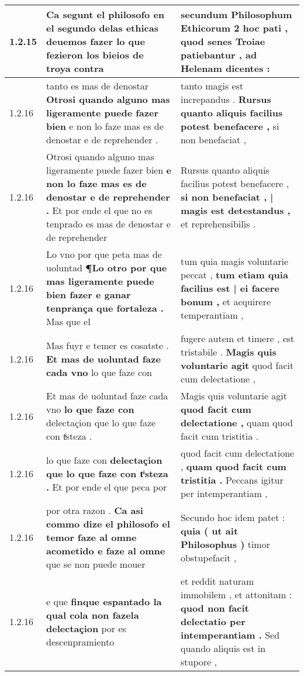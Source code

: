 \begin{tabular}{|p{1cm}|p{6.5cm}|p{6.5cm}|}
1.2.15 & Ca segunt el philosofo \textbf{ en el segundo delas ethicas deuemos fazer lo que fezieron los bieios de troya } contra & secundum Philosophum Ethicorum 2 hoc pati , \textbf{ quod senes Troiae patiebantur , } ad Helenam dicentes : \\\hline
1.2.16 & tanto es mas de denostar \textbf{ Otrosi quando alguno mas ligeramente puede fazer bien } e non lo faze mas es de denostar e de reprehender . & tanto magis est increpandus . \textbf{ Rursus quanto aliquis facilius potest benefacere , } si non benefaciat , \\\hline
1.2.16 & Otrosi quando alguno mas ligeramente puede fazer bien \textbf{ e non lo faze mas es de denostar e de reprehender . } Et por ende el que no es tenprado es mas de denostar e de reprehender & Rursus quanto aliquis facilius potest benefacere , \textbf{ si non benefaciat , | magis est detestandus , } et reprehensibilis . \\\hline
1.2.16 & Lo vno por que peta mas de uoluntad \textbf{ ¶Lo otro por que mas ligeramente puede bien fazer e ganar tenprança que fortaleza . } Mas que el & tum quia magis voluntarie peccat , \textbf{ tum etiam quia facilius est | ei facere bonum , } et acquirere temperantiam , \\\hline
1.2.16 & Mas fuyr e temer es cosatste . \textbf{ Et mas de uoluntad faze cada vno } lo que faze con & fugere autem et timere , est tristabile . \textbf{ Magis quis voluntarie agit } quod facit cum delectatione , \\\hline
1.2.16 & Et mas de uoluntad faze cada vno \textbf{ lo que faze con } delectaçion que lo que faze con tͥsteza . & Magis quis voluntarie agit \textbf{ quod facit cum delectatione , } quam quod facit cum tristitia . \\\hline
1.2.16 & lo que faze con \textbf{ delectaçion que lo que faze con tͥsteza . } Et por ende el que peca por & quod facit cum delectatione , \textbf{ quam quod facit cum tristitia . } Peccans igitur per intemperantiam , \\\hline
1.2.16 & por otra razon . \textbf{ Ca asi commo dize el philosofo el temor faze al omne acometido e faze al omne } que se non puede mouer & Secundo hoc idem patet : \textbf{ quia ( ut ait Philosophus ) } timor obstupefacit , \\\hline
1.2.16 & e que \textbf{ finque espantado la qual cola non fazela delectaçion } por es descenpramiento & et reddit naturam immobilem , et attonitam : \textbf{ quod non facit delectatio per intemperantiam . } Sed quando aliquis est in stupore , \\\hline

\end{tabular}
